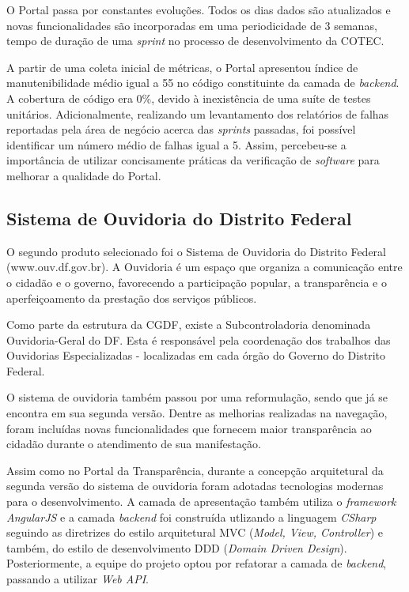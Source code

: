 O Portal passa por constantes evoluções. Todos os dias dados são atualizados e novas funcionalidades são incorporadas em uma periodicidade de 3 semanas, tempo de duração de uma \textit{sprint} no processo de desenvolvimento da COTEC. 

A partir de uma coleta inicial de métricas, o Portal apresentou índice de manutenibilidade médio igual a 55 no código constituinte da camada de \textit{backend}. A cobertura de código era 0\%, devido à inexistência de uma suíte de testes unitários. Adicionalmente, realizando um levantamento dos relatórios de falhas reportadas pela área de negócio acerca das \textit{sprints} passadas, foi possível identificar um número médio de falhas igual a 5. Assim, percebeu-se a importância de utilizar concisamente práticas da verificação de \textit{software} para melhorar a qualidade do Portal.

\subsection{Sistema de Ouvidoria do Distrito Federal}

O segundo produto selecionado foi o Sistema de Ouvidoria do Distrito Federal (www.ouv.df.gov.br). A Ouvidoria é um espaço que organiza a comunicação entre o cidadão e o governo, favorecendo a participação popular, a transparência e o aperfeiçoamento da prestação dos serviços públicos.

Como parte da estrutura da CGDF, existe a Subcontroladoria denominada Ouvidoria-Geral do DF. Esta é responsável pela coordenação dos trabalhos das Ouvidorias Especializadas - localizadas em cada órgão do Governo do Distrito Federal.

O sistema de ouvidoria também passou por uma reformulação, sendo que já se encontra em sua segunda versão. Dentre as melhorias realizadas na navegação, foram incluídas novas funcionalidades que fornecem maior transparência ao cidadão durante o atendimento de sua manifestação.

Assim como no Portal da Transparência, durante a concepção arquitetural da segunda versão do sistema de ouvidoria foram adotadas tecnologias modernas para o desenvolvimento. A camada de apresentação também utiliza o \textit{framework AngularJS} e a camada \textit{backend} foi construída utlizando a linguagem \textit{CSharp} seguindo as diretrizes do estilo arquitetural MVC (\textit{Model, View, Controller}) e também, do estilo de desenvolvimento DDD (\textit{Domain Driven Design}). Posteriormente, a equipe do projeto optou por refatorar a camada de \textit{backend}, passando a utilizar \textit{Web API}.

